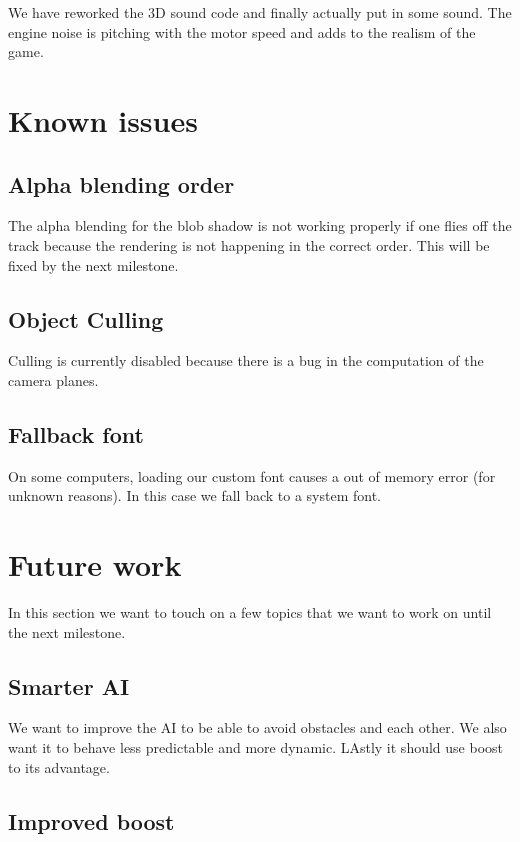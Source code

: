 \documentclass[11pt]{article}
\begin{document}
We have reworked the 3D sound code and finally actually put in some sound. The engine noise is pitching with the motor speed and adds to the realism of the game. 

\section{Known issues}

\subsection{Alpha blending order}

The alpha blending for the blob shadow is not working properly if one flies off the track because the rendering is not happening in the correct order. This will be fixed by the next milestone.

\subsection{Object Culling}

Culling is currently disabled because there is a bug in the computation of the camera planes.

\subsection{Fallback font}

On some computers, loading our custom font causes a out of memory error (for unknown reasons). In this case we fall back to a system font.


\section{Future work}
\label{future-work}

In this section we want to touch on a few topics that we want to work on until the next milestone.

\subsection{Smarter AI}

We want to improve the AI to be able to avoid obstacles and each other. We also want it to behave less predictable and more dynamic. LAstly it should use boost to its advantage.

\subsection{Improved boost}
\end{document}
